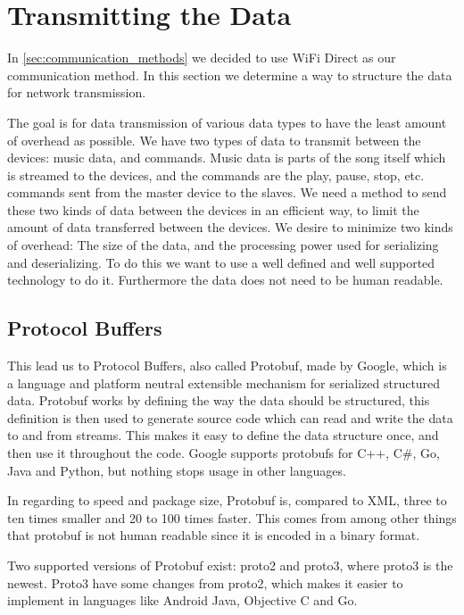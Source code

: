 \section{Transmitting the Data}\label{sec:transmit}
In \cref{sec:communication_methods} we decided to use WiFi Direct as our communication method.
In this section we determine a way to structure the data for network transmission.

\bigskip
The goal is for data transmission of various data types to have the least amount of overhead as possible.
We have two types of data to transmit between the devices: music data, and commands.
Music data is parts of the song itself which is streamed to the devices,
and the commands are the play, pause, stop, etc. commands sent from the master device to the slaves.
We need a method to send these two kinds of data between the devices in an efficient way,
to limit the amount of data transferred between the devices.
We desire to minimize two kinds of overhead: The size of the data, and the processing power used for serializing and deserializing.
To do this we want to use a well defined and well supported technology to do it.
Furthermore the data does not need to be human readable.

\subsection{Protocol Buffers}
This lead us to Protocol Buffers, also called Protobuf, made by Google, which is a language and platform neutral extensible mechanism for serialized structured data. 
Protobuf works by defining the way the data should be structured, this definition is then used to generate source code which can read and write the data to and from streams.\cite{protobuf}
This makes it easy to define the data structure once, and then use it throughout the code.
Google supports protobufs for C++, C\#, Go, Java and Python, but nothing stops usage in other languages\cite{protobuf}.

In regarding to speed and package size, Protobuf is, compared to XML, three to ten times smaller and 20 to 100 times faster.
This comes from among other things that protobuf is not human readable since it is encoded in a binary format.\cite{protobuf} 

Two supported versions of Protobuf exist: proto2 and proto3, where proto3 is the newest.
Proto3 have some changes from proto2, which makes it easier to implement in languages like Android Java, Objective C and Go.\cite{proto3}

